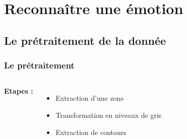 \documentclass{beamer}
\begin{document}
\section{Reconnaître une émotion}

\subsection{Le prétraitement de la donnée}
\begin{frame}
  \frametitle{Le prétraitement}
  \begin{columns}[c] 
      \textbf{Etapes :}
      \begin{itemize}
        \item Extraction d'une zone
        \item Transformation en niveaux de gris
        \item Extraction de contours
      \end{itemize}


\end{columns}
\end{frame}
\end{document}
